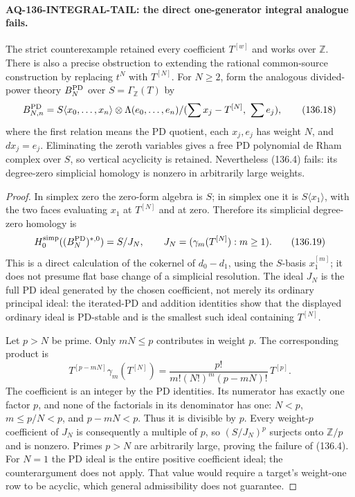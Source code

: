 \paragraph{AQ-136-INTEGRAL-TAIL: the direct one-generator integral analogue fails.}
The strict counterexample retained every coefficient
$T^{[w]}$ and works over $\mathbb Z$.  There is also a
precise obstruction to extending the rational common-source
construction by replacing $t^N$ with $T^{[N]}$.
For $N\geq2$, form the analogous divided-power theory
$B_N^{\rm PD}$ over $S=\Gamma_{\mathbb Z}(T)$ by
\[
 B_{N,n}^{\rm PD}
  =S\langle x_0,\ldots,x_n\rangle
       \otimes\Lambda(e_0,\ldots,e_n)
          /(\sum x_j-T^{[N]},\ \sum e_j),                   \tag{136.18}
\]
where the first relation means the PD quotient, each
$x_j,e_j$ has weight $N$, and $dx_j=e_j$.
Eliminating the zeroth variables gives a free PD
polynomial de Rham complex over $S$, so vertical
acyclicity is retained.  Nevertheless (136.4) fails:
its degree-zero simplicial homology is nonzero in
arbitrarily large weights.

\begin{proof}
In simplex zero the zero-form algebra is $S$; in
simplex one it is $S\langle x_1\rangle$, with the two
faces evaluating $x_1$ at $T^{[N]}$ and at zero.
Therefore its simplicial degree-zero homology is
\[
 H_0^{\rm simp}((B_N^{\rm PD})^{*,0})=S/J_N,
 \qquad J_N=(\gamma_m(T^{[N]}):m\geq1).                    \tag{136.19}
\]
This is a direct calculation of the cokernel of
$d_0-d_1$, using the $S$-basis $x_1^{[m]}$; it does
not presume flat base change of a simplicial
resolution.  The ideal $J_N$ is the full PD ideal
generated by the chosen coefficient, not merely
its ordinary principal ideal: the iterated-PD and
addition identities show that the displayed
ordinary ideal is PD-stable and is the smallest
such ideal containing $T^{[N]}$.

Let $p>N$ be prime.  Only $mN\leq p$ contributes
in weight $p$.  The corresponding product is
\[
 T^{[p-mN]}\gamma_m(T^{[N]})
   =\frac{p!}{m!(N!)^m(p-mN)!}\,T^{[p]}.                   \tag{136.20}
\]
The coefficient is an integer by the PD identities.
Its numerator has exactly one factor $p$, and
none of the factorials in its denominator has
one: $N<p$, $m\leq p/N<p$, and $p-mN<p$.
Thus it is divisible by $p$.
Every weight-$p$ coefficient of $J_N$ is consequently
a multiple of $p$, so $(S/J_N)^p$ surjects onto
$\mathbb Z/p$ and is nonzero.  Primes $p>N$ are
arbitrarily large, proving the failure of (136.4).
For $N=1$ the PD ideal is the entire positive
coefficient ideal; the counterargument does not
apply.  That value would require a target's
weight-one row to be acyclic, which general
admissibility does not guarantee.
\end{proof}

